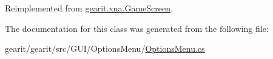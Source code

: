 Reimplemented from \hyperlink{classgearit_1_1xna_1_1_game_screen_a6bb803502dfbd62b275c2a21d182f88e}{gearit.\+xna.\+Game\+Screen}.



The documentation for this class was generated from the following file\+:\begin{DoxyCompactItemize}
\item 
gearit/gearit/src/\+G\+U\+I/\+Options\+Menu/\hyperlink{_options_menu_8cs}{Options\+Menu.\+cs}\end{DoxyCompactItemize}
